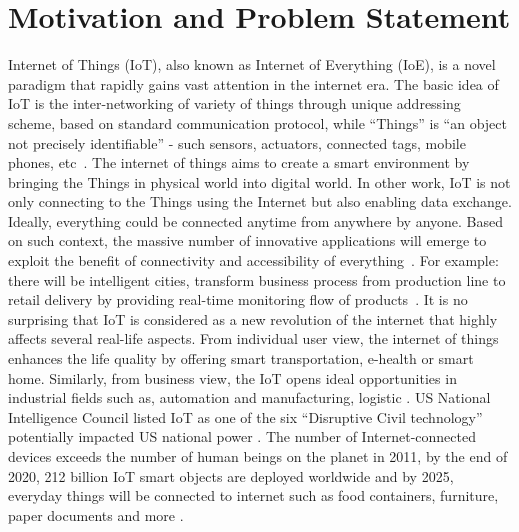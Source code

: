\section{Motivation and Problem Statement}

Internet of Things (IoT), also known as Internet of Everything (IoE), is a novel paradigm that rapidly gains vast attention in the internet era. The basic idea of IoT is the inter-networking of variety of things through unique addressing scheme, based on standard communication protocol, while ``Things'' is ``an object not precisely identifiable'' - such sensors, actuators, connected tags, mobile phones, etc~\cite{atzori2010internet}\cite{bassi2008internet}. 
The internet of things aims to create a smart environment by bringing the Things in physical world into digital world. In other work, IoT is not only connecting to the Things using the Internet but also enabling data exchange.
Ideally, everything could be connected anytime from anywhere by anyone. Based on such context, 
the massive number of innovative applications will emerge to exploit the benefit of connectivity and accessibility of everything~\cite{vermesan2013internet}. For example: there will be intelligent cities, transform business process from production line to retail delivery by providing real-time monitoring flow of products~\cite{lee2015internet}.
It is no surprising that IoT is considered as a new revolution of the internet that highly affects several real-life aspects. From individual user view, the internet of things enhances the life quality by offering smart transportation, e-health or smart home. Similarly, from business view, the IoT opens ideal opportunities in industrial fields such as, automation and manufacturing, logistic \cite{2010}. US National Intelligence Council listed IoT as one of the six “Disruptive Civil technology” potentially impacted US national power \cite{intelligence2008six}. The number of Internet-connected devices exceeds the number of human beings on the planet in 2011, by the end of 2020, 212 billion IoT smart objects are deployed worldwide and by 2025, everyday things will be connected to internet such as food containers, furniture, paper documents and more \cite{floyer2013defining}\cite{TheInter38:online}.
